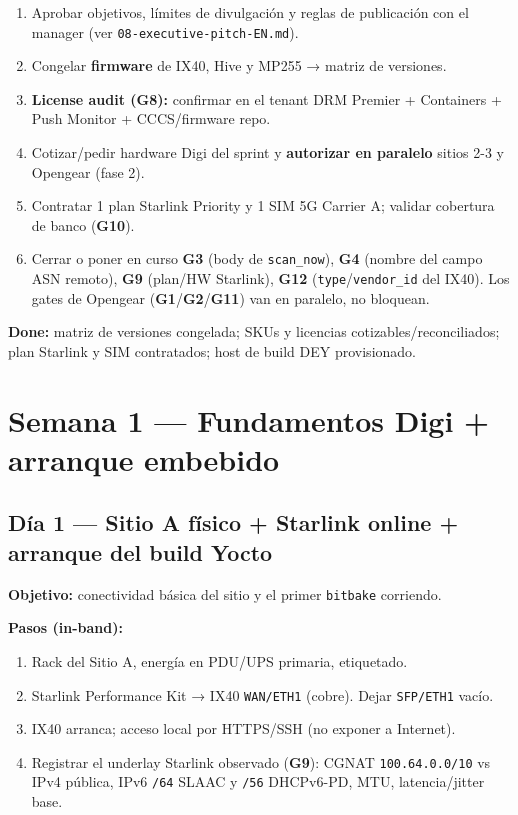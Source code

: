 \documentclass[11pt,a4paper]{article}
\newcommand{\file}[1]{\texttt{#1}}
\newcommand{\gate}[1]{\textbf{G#1}}
\newcommand{\done}{\textbf{Done:}}
\begin{document}
\begin{enumerate}
  \item Aprobar objetivos, límites de divulgación y reglas de publicación con el manager
        (ver \file{08-executive-pitch-EN.md}).
  \item Congelar \textbf{firmware} de IX40, Hive y MP255 → matriz de versiones.
  \item \textbf{License audit (\gate{8}):} confirmar en el tenant DRM Premier + Containers +
        Push Monitor + CCCS/firmware repo.
  \item Cotizar/pedir hardware Digi del sprint y \textbf{autorizar en paralelo} sitios 2-3 y
        Opengear (fase 2).
  \item Contratar 1 plan Starlink Priority y 1 SIM 5G Carrier A; validar cobertura de banco
        (\gate{10}).
  \item Cerrar o poner en curso \gate{3} (body de \file{scan\_now}), \gate{4} (nombre del campo
        ASN remoto), \gate{9} (plan/HW Starlink), \gate{12} (\file{type}/\file{vendor\_id} del
        IX40). Los gates de Opengear (\gate{1}/\gate{2}/\gate{11}) van en paralelo, no bloquean.
\end{enumerate}

\begin{clave}
\small
\done{} matriz de versiones congelada; SKUs y licencias cotizables/reconciliados; plan Starlink
y SIM contratados; host de build DEY provisionado.
\end{clave}

\section{Semana 1 — Fundamentos Digi + arranque embebido}

\subsection{Día 1 — Sitio A físico + Starlink online + arranque del build Yocto}

\textbf{Objetivo:} conectividad básica del sitio y el primer \file{bitbake} corriendo.

\textbf{Pasos (in-band):}
\begin{enumerate}
  \item Rack del Sitio A, energía en PDU/UPS primaria, etiquetado.
  \item Starlink Performance Kit → IX40 \file{WAN/ETH1} (cobre). Dejar \file{SFP/ETH1} vacío.
  \item IX40 arranca; acceso local por HTTPS/SSH (no exponer a Internet).
  \item Registrar el underlay Starlink observado (\textbf{\gate{9}}): CGNAT
        \file{100.64.0.0/10} vs IPv4 pública, IPv6 \file{/64} SLAAC y \file{/56} DHCPv6-PD,
        MTU, latencia/jitter base.
\end{enumerate}
\end{document}
